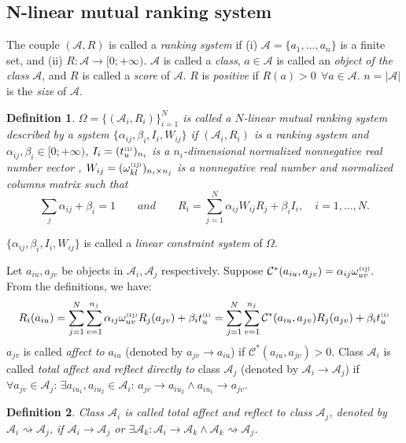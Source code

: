 \documentclass[10pt,leqno,twoside]{article}
\newtheorem{definition}{\indent Definition}[section]
\begin{document}
\subsection{N-linear mutual ranking system}
The couple $(\mathcal{A},R)$ is called a \emph{ranking system} if (i) $\mathcal{A} = \{a_1,\ldots,a_n\}$ is a finite set, and (ii) $R: \mathcal{A} \rightarrow [0;+\infty)$. $\mathcal{A}$ is called a \emph{class}, $a\in\mathcal{A}$ is called an \emph{object of the class} $\mathcal{A}$, and $R$ is called a \emph{score} of $\mathcal{A}$. $R$ is \emph{positive} if $R(a)>0 ~~\forall a \in \mathcal{A}$. $n = |\mathcal{A}|$ is the \emph{size} of $\mathcal{A}$.
\setlength{\parskip}{3pt}
\begin{definition}
$\Omega = \{(\mathcal{A}_i,R_i)\}_{i=1}^N$ is called a \emph{$N$-linear mutual ranking system} described by a system $\{\alpha_{ij},\beta_i,I_i,W_{ij}\}$ if $(\mathcal{A}_i,R_i)$ is a ranking system and $\alpha_{ij}, \beta_i \in [0;+\infty)$, $I_i=(t^{\texttt{\tiny(i)}}_u)_{n_i}$ is a $n_i$-dimensional normalized nonnegative real number vector , $W_{ij}=(\omega^{\texttt{\tiny(ij)}}_{kl})_{n_i \times n_j}$ is a nonnegative real number and normalized columns matrix such that
\[\sum_j\alpha_{ij}+ \beta_i=1\qquad and \qquad R_i = \sum^N_{j=1}\alpha_{ij}W_{ij}R_j + \beta_i I_i,\quad i=1,\ldots,N.\]
\end{definition}
$\{\alpha_{ij},\beta_i,I_i,W_{ij}\}$ is called a \emph{linear constraint system} of $\Omega$.

Let $a_{iu}, a_{jv}$ be objects in $\mathcal{A}_i, \mathcal{A}_j$ respectively. Suppose $\mathcal{C}^*(a_{iu},a_{jv})=\alpha_{ij}\omega^{\texttt{\tiny(ij)}}_{uv}.$
From the definitions, we have:
\[ R_i(a_{iu}) = \sum^N_{j=1}\sum^{n_j}_{v=1}\alpha_{ij}\omega^{\texttt{\tiny(ij)}}_{uv}R_j(a_{jv}) + \beta_i t^{\texttt{\tiny(i)}}_u=\sum^N_{j=1}\sum^{n_j}_{v=1}\mathcal{C}^*(a_{iu},a_{jv})R_j(a_{jv}) + \beta_i t^{\texttt{\tiny(i)}}_u\]
$a_{jv}$ is called \emph{affect to}  $a_{iu}$ (denoted by $a_{jv}\rightarrow a_{iu}$) if $\mathcal{C}^*(a_{iu},a_{jv})>0$. Class $\mathcal{A}_i$ is called  \emph{total affect and reflect directly to} class $\mathcal{A}_j$ (denoted by $\mathcal{A}_i\rightarrow \mathcal{A}_j$) if $\forall a_{jv}\in\mathcal{A}_j$:  $\exists a_{iu_1}, a_{iu_2}\in\mathcal{A}_i$: $a_{jv}\rightarrow a_{iu_2} \wedge a_{iu_1}\rightarrow a_{jv}$.
\begin{definition}
Class $\mathcal{A}_i$ is called  \emph{total affect and reflect to} class $\mathcal{A}_j$, denoted by $\mathcal{A}_i \rightsquigarrow \mathcal{A}_j$, if $\mathcal{A}_i\rightarrow \mathcal{A}_j$ or $\exists \mathcal{A}_k: \mathcal{A}_i\rightarrow \mathcal{A}_k \wedge \mathcal{A}_k \rightsquigarrow \mathcal{A}_j$.
\end{definition}
\end{document}

